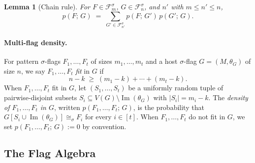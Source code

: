 \documentclass{article}
\newtheorem{lemma}[lemma]{Lemma}
\newcommand{\den}[2]{p(#1;\,#2)}
\begin{document}
\begin{lemma}[Chain rule]\label{lem:chain-rule}
  For $F \in \mathcal{F}^\sigma_m$, $G \in \mathcal{F}^\sigma_n$, and $n'$
  with $m \leq n' \leq n$,
  \[
    \den{F}{G}
    \;=\;
    \sum_{G' \in \mathcal{F}^\sigma_{n'}} \den{F}{G'}\,\den{G'}{G}.
  \]
\end{lemma}

\paragraph{Multi-flag density.}
For pattern $\sigma$-flags $F_1, \ldots, F_t$ of sizes $m_1, \ldots, m_t$ and
a host $\sigma$-flag $G = (M, \theta_G)$ of size $n$, we say $F_1, \ldots, F_t$
\emph{fit} in $G$ if
\[
  n - k \;\geq\; (m_1 - k) + \cdots + (m_t - k).
\]
When $F_1, \ldots, F_t$ fit in $G$, let $(S_1, \ldots, S_t)$ be a uniformly
random tuple of pairwise-disjoint subsets $S_i \subseteq V(G) \setminus
\operatorname{Im}(\theta_G)$ with $|S_i| = m_i - k$.
The \emph{density of $F_1, \ldots, F_t$ in $G$}, written $\den{F_1,\ldots,F_t}{G}$, is the
probability that $G[S_i \cup \operatorname{Im}(\theta_G)] \cong_\sigma F_i$
for every $i \in [t]$.
When $F_1, \ldots, F_t$ do not fit in $G$, we set
$\den{F_1,\ldots,F_t}{G} := 0$ by convention.

\subsection{The Flag Algebra}
\end{document}
